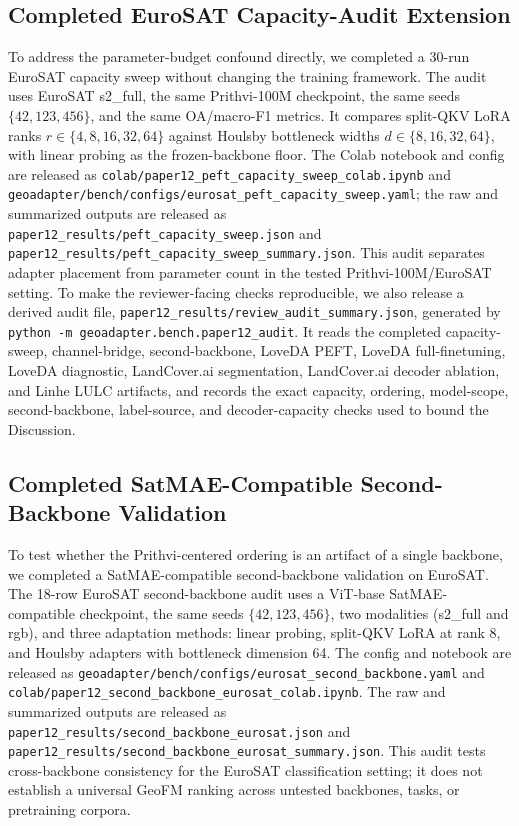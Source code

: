 \subsection{Completed EuroSAT Capacity-Audit Extension}
To address the parameter-budget confound directly, we completed a 30-run EuroSAT capacity sweep without changing the training framework. The audit uses EuroSAT s2\_full, the same Prithvi-100M checkpoint, the same seeds $\{42,123,456\}$, and the same OA/macro-F1 metrics. It compares split-QKV LoRA ranks $r\in\{4,8,16,32,64\}$ against Houlsby bottleneck widths $d\in\{8,16,32,64\}$, with linear probing as the frozen-backbone floor. The Colab notebook and config are released as \texttt{colab/paper12\_peft\_capacity\_sweep\_colab.ipynb} and \texttt{geoadapter/bench/configs/eurosat\_peft\_capacity\_sweep.yaml}; the raw and summarized outputs are released as \texttt{paper12\_results/peft\_capacity\_sweep.json} and \texttt{paper12\_results/peft\_capacity\_sweep\_summary.json}. This audit separates adapter placement from parameter count in the tested Prithvi-100M/EuroSAT setting. To make the reviewer-facing checks reproducible, we also release a derived audit file, \texttt{paper12\_results/review\_audit\_summary.json}, generated by \texttt{python -m geoadapter.bench.paper12\_audit}. It reads the completed capacity-sweep, channel-bridge, second-backbone, LoveDA PEFT, LoveDA full-finetuning, LoveDA diagnostic, LandCover.ai segmentation, LandCover.ai decoder ablation, and Linhe LULC artifacts, and records the exact capacity, ordering, model-scope, second-backbone, label-source, and decoder-capacity checks used to bound the Discussion.
\subsection{Completed SatMAE-Compatible Second-Backbone Validation}
To test whether the Prithvi-centered ordering is an artifact of a single backbone, we completed a SatMAE-compatible second-backbone validation on EuroSAT. The 18-row EuroSAT second-backbone audit uses a ViT-base SatMAE-compatible checkpoint, the same seeds $\{42,123,456\}$, two modalities (s2\_full and rgb), and three adaptation methods: linear probing, split-QKV LoRA at rank 8, and Houlsby adapters with bottleneck dimension 64. The config and notebook are released as \texttt{geoadapter/bench/configs/eurosat\_second\_backbone.yaml} and \texttt{colab/paper12\_second\_backbone\_eurosat\_colab.ipynb}. The raw and summarized outputs are released as \texttt{paper12\_results/second\_backbone\_eurosat.json} and \texttt{paper12\_results/second\_backbone\_eurosat\_summary.json}. This audit tests cross-backbone consistency for the EuroSAT classification setting; it does not establish a universal GeoFM ranking across untested backbones, tasks, or pretraining corpora.
